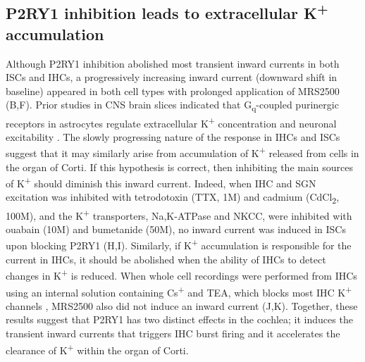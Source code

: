 \documentclass[9pt,lineno]{elife}
\begin{document}
\subsection{P2RY1 inhibition leads to extracellular K\textsuperscript{+} accumulation}
Although P2RY1 inhibition abolished most transient inward currents in both ISCs and IHCs, a progressively increasing inward current (downward shift in baseline) appeared in both cell types with prolonged application of MRS2500 (B,F). Prior studies in CNS brain slices indicated that  G\textsubscript{q}-coupled purinergic receptors in astrocytes regulate extracellular K\textsuperscript{+} concentration and neuronal excitability \citep{Wang2012}. The slowly progressing nature of the response in IHCs and ISCs suggest that it may similarly arise from accumulation of K\textsuperscript{+} released from cells in the organ of Corti. If this hypothesis is correct, then inhibiting the main sources of K\textsuperscript{+} should diminish this inward current. Indeed, when IHC and SGN excitation was inhibited with tetrodotoxin (TTX, 1\textmu M) and cadmium (CdCl\textsubscript{2}, 100\textmu M), and the K\textsuperscript{+} transporters, Na,K-ATPase and NKCC, were inhibited with ouabain (10\textmu M) and bumetanide (50\textmu M), no inward current was induced in ISCs upon blocking P2RY1 (H,I). Similarly, if K\textsuperscript{+} accumulation is responsible for the current in IHCs, it should be abolished when the ability of IHCs to detect changes in K\textsuperscript{+} is reduced. When whole cell recordings were performed from IHCs using an internal solution containing Cs\textsuperscript{+} and TEA, which blocks most IHC K\textsuperscript{+} channels \citep{kros1998expression,marcotti2003developmental}, MRS2500 also did not induce an inward current (J,K). Together, these results suggest that P2RY1 has two distinct effects in the cochlea; it induces the transient inward currents that triggers IHC burst firing and it accelerates the clearance of K\textsuperscript{+} within the organ of Corti.
\end{document}
